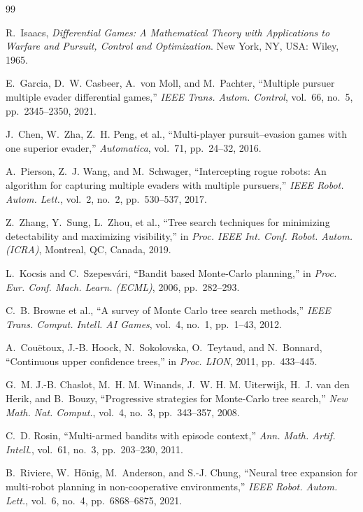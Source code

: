 \documentclass[letterpaper,10pt,conference]{ieeeconf}
\begin{document}
\begin{thebibliography}{99}

R.~Isaacs, \emph{Differential Games: A Mathematical Theory with
Applications to Warfare and Pursuit, Control and Optimization}. New York,
NY, USA: Wiley, 1965.

E.~Garcia, D.~W. Casbeer, A.~von Moll, and M.~Pachter, ``Multiple
pursuer multiple evader differential games,'' \emph{IEEE Trans. Autom.
Control}, vol.~66, no.~5, pp.~2345--2350, 2021.

J.~Chen, W.~Zha, Z.~H. Peng, et al., ``Multi-player pursuit--evasion
games with one superior evader,'' \emph{Automatica}, vol.~71, pp.~24--32,
2016.

A.~Pierson, Z.~J. Wang, and M.~Schwager, ``Intercepting rogue robots: An
algorithm for capturing multiple evaders with multiple pursuers,''
\emph{IEEE Robot. Autom. Lett.}, vol.~2, no.~2, pp.~530--537, 2017.

Z.~Zhang, Y.~Sung, L.~Zhou, et al., ``Tree search techniques for
minimizing detectability and maximizing visibility,'' in \emph{Proc.
IEEE Int. Conf. Robot. Autom. (ICRA)}, Montreal, QC, Canada, 2019.

L.~Kocsis and C.~Szepesv\'ari, ``Bandit based Monte-Carlo planning,'' in
\emph{Proc. Eur. Conf. Mach. Learn. (ECML)}, 2006, pp.~282--293.

C.~B. Browne et al., ``A survey of Monte Carlo tree search methods,''
\emph{IEEE Trans. Comput. Intell. AI Games}, vol.~4, no.~1, pp.~1--43,
2012.

A.~Cou\"etoux, J.-B. Hoock, N.~Sokolovska, O.~Teytaud, and N.~Bonnard,
``Continuous upper confidence trees,'' in \emph{Proc. LION}, 2011,
pp.~433--445.

G.~M. J.-B. Chaslot, M.~H. M. Winands, J.~W. H. M. Uiterwijk, H.~J. van
den Herik, and B.~Bouzy, ``Progressive strategies for Monte-Carlo tree
search,'' \emph{New Math. Nat. Comput.}, vol.~4, no.~3, pp.~343--357,
2008.

C.~D. Rosin, ``Multi-armed bandits with episode context,'' \emph{Ann.
Math. Artif. Intell.}, vol.~61, no.~3, pp.~203--230, 2011.

B.~Riviere, W.~H\"onig, M.~Anderson, and S.-J. Chung, ``Neural tree
expansion for multi-robot planning in non-cooperative environments,''
\emph{IEEE Robot. Autom. Lett.}, vol.~6, no.~4, pp.~6868--6875, 2021.


\end{thebibliography}
\end{document}
